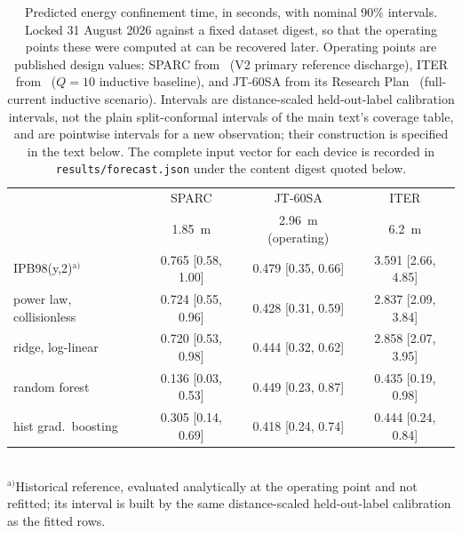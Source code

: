 \documentclass[12pt,letterpaper]{article}
\begin{document}
\begin{table}[!ht]
\centering
\small
\caption{Predicted energy confinement time, in seconds, with nominal 90\%
intervals. Locked 31 August 2026 against a fixed dataset digest, so that the operating
points these were computed at can be recovered later. Operating
points are published design values: SPARC from~\cite{creely} (V2 primary
reference discharge), ITER from~\cite{ipb98} ($Q=10$ inductive baseline), and
JT-60SA from its Research Plan~\cite{jt60saplan} (full-current inductive
scenario). Intervals are distance-scaled held-out-label calibration intervals, not
the plain split-conformal intervals of the main text's coverage table, and are
pointwise intervals for a new observation; their construction is specified in
the text below. The complete input vector for each device is recorded in
\texttt{results/forecast.json} under the content digest quoted below.}
\label{tab:supforecast}
\begin{tabular}{lccc}
\toprule
& SPARC & JT-60SA & ITER \\
& \SI{1.85}{\metre} & \SI{2.96}{\metre} (operating) & \SI{6.2}{\metre} \\
\midrule
IPB98(y,2)$^{\mathrm{a)}}$ & 0.765 [0.58, 1.00] & 0.479 [0.35, 0.66] & 3.591 [2.66, 4.85] \\
power law, collisionless & 0.724 [0.55, 0.96] & 0.428 [0.31, 0.59] & 2.837 [2.09, 3.84] \\
ridge, log-linear & 0.720 [0.53, 0.98] & 0.444 [0.32, 0.62] & 2.858 [2.07, 3.95] \\
random forest & 0.136 [0.03, 0.53] & 0.449 [0.23, 0.87] & 0.435 [0.19, 0.98] \\
hist grad.\ boosting & 0.305 [0.14, 0.69] & 0.418 [0.24, 0.74] & 0.444 [0.24, 0.84] \\
\bottomrule
\end{tabular}
\\[2pt]
{\footnotesize $^{\mathrm{a)}}$Historical reference, evaluated analytically at the
operating point and not refitted; its interval is built by the same
distance-scaled held-out-label calibration as the fitted rows.}
\par\smallskip{}
\end{table}
\end{document}
